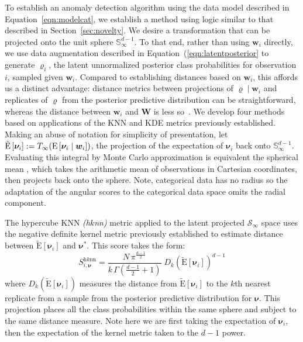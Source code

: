 To establish an anomaly detection algorithm using the data model described in 
    Equation~\ref{eqn:modelcat}, we establish a method using logic similar to 
    that described in Section~\ref{sec:novelty}.  We desire a transformation that 
    can be projected onto the unit sphere $\mathbb{S}_{\infty}^{d-1}$.  To that 
    end, rather than using $\bm{w}_i$ directly, we use data augmentation
    described in Equation~(\ref{eqn:latentposterior} to generate $\bm{\varrho}_i$, 
    the latent unnormalized posterior class probabilities for observation $i$, 
    sampled given $\bm{w}_i$.  Compared to 
    establishing distances based on $\bm{w}_i$, this affords us a distinct 
    advantage: distance metrics between projections of 
    $\bm{\varrho}\mid\bm{w}_i$ and replicates of $\bm{\varrho}$ from the posterior 
    predictive 
    distribution can be straightforward, whereas the distance between $\bm{w}_i$ 
    and $\bm{W}$ is less so~\citep{Alamuri2014}. We develop four methods based
    on applications of the KNN and KDE metrics previously established.
    Making an abuse of notation for simplicity of presentation, let 
    $\tilde{\text{E}}\left[\bm{\nu}_i\right] := T_{\infty}(\text{E}\left[\bm{\nu}_i\mid\bm{w}_i\right])$, 
    the projection of the expectation of $\bm{\nu}_i$ back onto 
    $\mathbb{S}_{\infty}^{d-1}$.  Evaluating this integral by
    Monte Carlo approximation is equivalent the spherical mean 
    \citep{mardia1999}, which takes the arithmetic mean of observations in 
    Cartesian coordinates, then projects back onto the sphere. Note, 
    categorical data has no radius so the adaptation of the angular scores to 
    the categorical data space omits the radial component.

The hypercube KNN \emph{(h$k$nn)} metric applied to the latent projected 
    $\mathcal{S}_{\infty}$ space uses the negative definite kernel metric 
    previously established to estimate distance between $\tilde{\text{E}}[\bm{\nu}_i]$
    and $\bm{\nu}^*$.  This score takes the form:
    \begin{equation}
      \label{score:cat_hknn}
      S_{i,\bm{\nu}}^{\text{h$k$nn}} = \frac{N\,\pi^{\frac{d-1}{2}}}{k\,\Gamma\left(\frac{d-1}{2} + 1\right)}
        \;D_{k}\left(\tilde{\text{E}}[\bm{\nu}_i]\right)^{d-1}
    \end{equation}
    where $D_{k}\left(\tilde{\text{E}}[\bm{\nu}_i]\right)$ measures the 
    distance from $\tilde{\text{E}}[\bm{\nu}_i]$ to the $k$th nearest replicate from 
    a sample from the posterior predictive distribution for $\bm{\nu}$.  This 
    projection places all the class probabilities within the same sphere and 
    subject to the same distance measure.  Note here we are first taking the 
    expectation of $\bm{\nu}_i$, then the expectation of the kernel metric taken 
    to the $d-1$ power.

